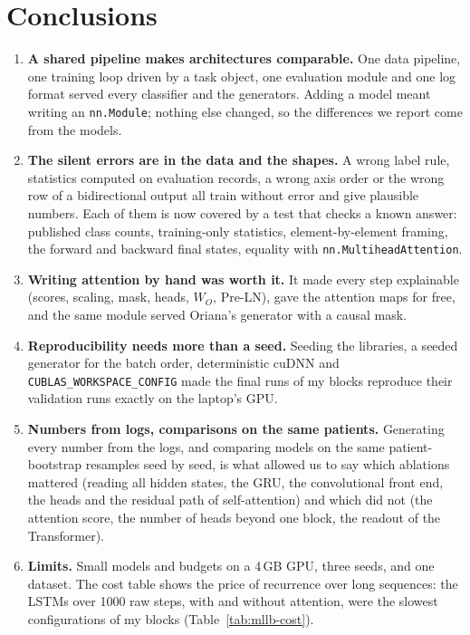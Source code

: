 \section{Conclusions}\label{sec:mllb-conclusions}

\begin{enumerate}[leftmargin=1.4em,itemsep=2pt]
  \item \textbf{A shared pipeline makes architectures comparable.} One data pipeline, one training loop
        driven by a task object, one evaluation module and one log format served every classifier and the
        generators. Adding a model meant writing an \texttt{nn.Module}; nothing else changed, so the
        differences we report come from the models.
  \item \textbf{The silent errors are in the data and the shapes.} A wrong label rule, statistics computed
        on evaluation records, a wrong axis order or the wrong row of a bidirectional output all train
        without error and give plausible numbers. Each of them is now covered by a test that checks a known
        answer: published class counts, training-only statistics, element-by-element framing, the forward
        and backward final states, equality with \texttt{nn.MultiheadAttention}.
  \item \textbf{Writing attention by hand was worth it.} It made every step explainable (scores, scaling,
        mask, heads, $W_O$, Pre-LN), gave the attention maps for free, and the same module served
        Oriana's generator with a causal mask.
  \item \textbf{Reproducibility needs more than a seed.} Seeding the libraries, a seeded generator for the
        batch order, deterministic cuDNN and \texttt{CUBLAS\_WORKSPACE\_CONFIG} made the final runs of my
        blocks reproduce their validation runs exactly on the laptop's GPU.
  \item \textbf{Numbers from logs, comparisons on the same patients.} Generating every number from the
        logs, and comparing models on the same patient-bootstrap resamples seed by seed, is what allowed
        us to say which ablations mattered (reading all hidden states, the GRU, the convolutional front
        end, the heads and the residual path of self-attention) and which did not (the attention score, the
        number of heads beyond one block, the readout of the Transformer).
  \item \textbf{Limits.} Small models and budgets on a 4\,GB GPU, three seeds, and one dataset. The
        cost table shows the price of recurrence over long sequences: the LSTMs over 1000 raw steps, with and
        without attention, were the slowest configurations of my blocks (Table~\ref{tab:mllb-cost}).
\end{enumerate}

